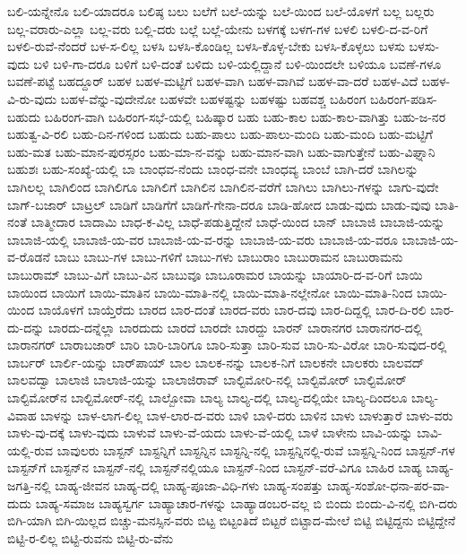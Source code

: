 {ಬಲಿ-ಯನ್ನೇನೊ
ಬಲಿ-ಯಾದರೂ
ಬಲಿಷ್ಠ
ಬಲು
ಬಲೆಗೆ
ಬಲೆ-ಯನ್ನು
ಬಲೆ-ಯಿಂದ
ಬಲೆ-ಯೊಳಗೆ
ಬಲ್ಲ
ಬಲ್ಲರು
ಬಲ್ಲ-ವರಾರು-ಎಲ್ಲಾ
ಬಲ್ಲ-ವರು
ಬಲ್ಲಿ-ದರು
ಬಲ್ಲೆ
ಬಲ್ಲೆ-ಯೇನು
ಬಳಗಕ್ಕೆ
ಬಳಗ-ಗಳ
ಬಳಲಿ
ಬಳಲಿ-ದ-ವ-ರಿಗೆ
ಬಳಲಿ-ರುವೆ-ನೆಂದರೆ
ಬಳ-ಸ-ಲಿಲ್ಲ
ಬಳಸಿ
ಬಳಸಿ-ಕೊಂಡಿಲ್ಲ
ಬಳಸಿ-ಕೊಳ್ಳ-ಬೇಕು
ಬಳಸಿ-ಕೊಳ್ಳಲು
ಬಳಸು
ಬಳಸು-ವುದು
ಬಳಿ
ಬಳಿ-ಗಾ-ದರೂ
ಬಳಿಗೆ
ಬಳಿ-ದಂತೆ
ಬಳಿದು
ಬಳಿ-ಯಲ್ಲಿದ್ದಾನೆ
ಬಳಿ-ಯಿಂದಲೇ
ಬಳಿಯೂ
ಬವಣೆ-ಗಳೂ
ಬವಣೆ-ಪಟ್ಟೆ
ಬಹದ್ದೂರ್
ಬಹಳ
ಬಹಳ-ಮಟ್ಟಿಗೆ
ಬಹಳ-ವಾಗಿ
ಬಹಳ-ವಾಗಿವೆ
ಬಹಳ-ವಾ-ದರೆ
ಬಹಳ-ವಿದೆ
ಬಹಳ-ವಿ-ರು-ವುದು
ಬಹಳ-ವೆನ್ನು-ವುದೇನೋ
ಬಹಳವೇ
ಬಹಳಷ್ಟನ್ನು
ಬಹಳಷ್ಟು
ಬಹವಶ್ಚ
ಬಹಿರಂಗ
ಬಹಿರಂಗ-ಪಡಿಸ-ಬಹುದು
ಬಹಿರಂಗ-ವಾಗಿ
ಬಹಿರಂಗ-ಸಭೆ-ಯಲ್ಲಿ
ಬಹಿಷ್ಕಾರ
ಬಹು
ಬಹು-ಕಾಲ
ಬಹು-ಕಾಲ-ವಾಗಿತ್ತು
ಬಹು-ಜ-ನರ
ಬಹುತ್ವ-ವಿ-ರಲಿ
ಬಹು-ದಿನ-ಗಳಿಂದ
ಬಹುದು
ಬಹು-ಪಾಲು
ಬಹು-ಪಾಲು-ಮಂದಿ
ಬಹು-ಮಂದಿ
ಬಹು-ಮಟ್ಟಿಗೆ
ಬಹು-ಮತ
ಬಹು-ಮಾನ-ಪುರಸ್ಸರಂ
ಬಹು-ಮಾ-ನ-ವನ್ನು
ಬಹು-ಮಾನ-ವಾಗಿ
ಬಹು-ವಾಗುತ್ತೇನೆ
ಬಹು-ವಿಘ್ನಾನಿ
ಬಹುಶಃ
ಬಹು-ಸಂಖ್ಯೆ-ಯಲ್ಲಿ
ಬಾ
ಬಾಂಧವ-ನೆಂದು
ಬಾಂಧ-ವನೇ
ಬಾಂಧವ್ಯ
ಬಾಂಬೆ
ಬಾಗಿ-ದರೆ
ಬಾಗಿಲನ್ನು
ಬಾಗಿಲಲ್ಲ
ಬಾಗಿಲಿಂದ
ಬಾಗಿಲಿಗೂ
ಬಾಗಿಲಿಗೆ
ಬಾಗಿಲಿನ
ಬಾಗಿಲಿನ-ವರೆಗೆ
ಬಾಗಿಲು
ಬಾಗಿಲು-ಗಳನ್ನು
ಬಾಗು-ವುದೇ
ಬಾಗ್‌-ಬಜಾರ್
ಬಾಟ್ರಲ್
ಬಾಡಿಗೆ
ಬಾಡಿಗೆಗೆ
ಬಾಡಿಗೆ-ಗೇನಾ-ದರೂ
ಬಾಡಿ-ಹೋದ
ಬಾಡು-ವುದು
ಬಾಡು-ವುವು
ಬಾತಿ-ನಂತೆ
ಬಾತ್ಮೀದಾರ
ಬಾದಾಮಿ
ಬಾಧ-ಕ-ವಿಲ್ಲ
ಬಾಧೆ-ಪಡುತ್ತಿದ್ದೇನೆ
ಬಾಧೆ-ಯಿಂದ
ಬಾನ್
ಬಾಬಾಜಿ
ಬಾಬಾಜಿ-ಯನ್ನು
ಬಾಬಾಜಿ-ಯಲ್ಲಿ
ಬಾಬಾಜಿ-ಯ-ವರ
ಬಾಬಾಜಿ-ಯ-ವ-ರನ್ನು
ಬಾಬಾಜಿ-ಯ-ವರು
ಬಾಬಾಜಿ-ಯ-ವರೂ
ಬಾಬಾಜಿ-ಯ-ವ-ರೊಡನೆ
ಬಾಬು
ಬಾಬು-ಗಳ
ಬಾಬು-ಗಳಿಗೆ
ಬಾಬು-ಗಳು
ಬಾಬುರಾಂ
ಬಾಬುರಾಮನ
ಬಾಬುರಾಮನು
ಬಾಬುರಾಮ್
ಬಾಬು-ವಿಗೆ
ಬಾಬು-ವಿನ
ಬಾಬುವೂ
ಬಾಬೂರಾಮರ
ಬಾಯನ್ನು
ಬಾಯಾರಿ-ದ-ವ-ರಿಗೆ
ಬಾಯಿ
ಬಾಯಿಂದ
ಬಾಯಿಗೆ
ಬಾಯಿ-ಮಾತಿನ
ಬಾಯಿ-ಮಾತಿ-ನಲ್ಲಿ
ಬಾಯಿ-ಮಾತಿ-ನಲ್ಲೇನೋ
ಬಾಯಿ-ಮಾತಿ-ನಿಂದ
ಬಾಯಿ-ಯಿಂದ
ಬಾಯೊಳಗೆ
ಬಾಯ್ತೆರೆದು
ಬಾರದ
ಬಾರ-ದಂತೆ
ಬಾರದ-ವರು
ಬಾರ-ದವು
ಬಾರ-ದಿದ್ದಲ್ಲಿ
ಬಾರ-ದಿ-ರಲಿ
ಬಾರ-ದು-ದನ್ನು
ಬಾರದು-ದನ್ನೆಲ್ಲಾ
ಬಾರದುದು
ಬಾರದೆ
ಬಾರದೇ
ಬಾರದ್ದು
ಬಾರನ್
ಬಾರಾನಗರ
ಬಾರಾನಗರ-ದಲ್ಲಿ
ಬಾರಾನಗರ್
ಬಾರಾಬಜಾರ್
ಬಾರಿ
ಬಾರಿ-ಬಾರಿಗೂ
ಬಾರಿ-ಸುತ್ತಾ
ಬಾರಿ-ಸುವ
ಬಾರಿ-ಸು-ವಿರೋ
ಬಾರಿ-ಸುವುದ-ರಲ್ಲಿ
ಬಾರ್ಬರ್
ಬಾರ್ಲಿ-ಯನ್ನು
ಬಾರ್‌ಪಾಯ್
ಬಾಲ
ಬಾಲಕ-ನನ್ನು
ಬಾಲಕ-ನಿಗೆ
ಬಾಲಕನೇ
ಬಾಲಕರು
ಬಾಲವದ್
ಬಾಲವದ್ವಾ
ಬಾಲಾಜಿ
ಬಾಲಾಜಿ-ಯನ್ನು
ಬಾಲಾಜಿರಾವ್
ಬಾಲ್ಟಿಮೋರಿ-ನಲ್ಲಿ
ಬಾಲ್ಟಿಮೋರ್
ಬಾಲ್ಟಿಮೋರ್‌
ಬಾಲ್ಟಿಮೋರ್‌ನ
ಬಾಲ್ಟಿಮೋರ್‌-ನಲ್ಲಿ
ಬಾಲ್ಬೋವಾ
ಬಾಲ್ಯ
ಬಾಲ್ಯ-ದಲ್ಲಿ
ಬಾಲ್ಯ-ದಲ್ಲಿಯೇ
ಬಾಲ್ಯ-ದಿಂದಲೂ
ಬಾಲ್ಯ-ವಿವಾಹ
ಬಾಳನ್ನು
ಬಾಳ-ಲಾಗ-ಲಿಲ್ಲ
ಬಾಳ-ಲಾರ-ದ-ವರು
ಬಾಳಿ
ಬಾಳಿ-ದರು
ಬಾಳಿನ
ಬಾಳು
ಬಾಳುತ್ತಾರೆ
ಬಾಳು-ವರು
ಬಾಳು-ವು-ದಕ್ಕೆ
ಬಾಳು-ವುದು
ಬಾಳುವೆ
ಬಾಳು-ವೆ-ಯದು
ಬಾಳು-ವೆ-ಯಲ್ಲಿ
ಬಾಳೆ
ಬಾಳೇನು
ಬಾವಿ-ಯನ್ನು
ಬಾವಿ-ಯಲ್ಲಿ-ರುವ
ಬಾವುಲರು
ಬಾಸ್ಟನ್
ಬಾಸ್ಟನ್ನಿಗೆ
ಬಾಸ್ಟನ್ನಿನ
ಬಾಸ್ಟನ್ನಿ-ನಲ್ಲಿ
ಬಾಸ್ಟನ್ನಿನಲ್ಲಿ-ರುವೆ
ಬಾಸ್ಟನ್ನಿ-ನಿಂದ
ಬಾಸ್ಟನ್‌-ಗಳ
ಬಾಸ್ಟನ್‌ಗೆ
ಬಾಸ್ಟನ್‌ನ
ಬಾಸ್ಟನ್‌-ನಲ್ಲಿ
ಬಾಸ್ಟನ್‌ನಲ್ಲಿಯೂ
ಬಾಸ್ಟನ್‌-ನಿಂದ
ಬಾಸ್ಟನ್‌-ವರೆ-ವಿಗೂ
ಬಾಹಿರ
ಬಾಹ್ಯ
ಬಾಹ್ಯ-ಜಗತ್ತಿ-ನಲ್ಲಿ
ಬಾಹ್ಯ-ಜೀವನ
ಬಾಹ್ಯ-ದಲ್ಲಿ
ಬಾಹ್ಯ-ಪೂಜಾ-ವಿಧಿ-ಗಳು
ಬಾಹ್ಯ-ಸಂಪತ್ತು
ಬಾಹ್ಯ-ಸಂಶೋ-ಧನಾ-ಪರ-ವಾ-ದುದು
ಬಾಹ್ಯ-ಸಮಾಜ
ಬಾಹ್ಯಸ್ವರ್ಗ
ಬಾಹ್ಯಾಚಾರ-ಗಳನ್ನು
ಬಾಹ್ಯಾಡಂಬರ-ವಲ್ಲ
ಬಿ
ಬಿಂದು
ಬಿಂದು-ವಿ-ನಲ್ಲಿ
ಬಿಗಿ-ದರು
ಬಿಗಿ-ಯಾಗಿ
ಬಿಗಿ-ಯಿಲ್ಲದ
ಬಿಚ್ಚು-ಮನಸ್ಸಿನ-ವರು
ಬಿಟ್ಟ
ಬಿಟ್ಟಂತಿದೆ
ಬಿಟ್ಟರೆ
ಬಿಟ್ಟಾದ-ಮೇಲೆ
ಬಿಟ್ಟಿ
ಬಿಟ್ಟಿದ್ದನು
ಬಿಟ್ಟಿದ್ದೇನೆ
ಬಿಟ್ಟಿ-ರ-ಲಿಲ್ಲ
ಬಿಟ್ಟಿ-ರುವನು
ಬಿಟ್ಟಿ-ರು-ವೆನು
}
